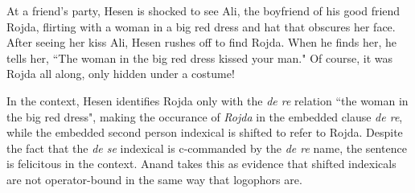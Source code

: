 \documentclass[output=paper]{langscibook}
\begin{document}
\begin{context}
At a friend's party, Hesen is shocked to see Ali, the boyfriend of his good friend Rojda, flirting with a woman in a big red dress and hat that obscures her face. After seeing her kiss Ali, Hesen rushes off to find Rojda. When he finds her, he tells her, ``The woman in the big red dress kissed your man." Of course, it was Rojda all along, only hidden under a costume!
\end{context}
\begin{exe}
	\label{noblock}
\end{exe}
In the context, Hesen identifies Rojda only with the \textit{de re} relation ``the woman in the big red dress", making the occurance of \textit{Rojda} in the embedded clause \textit{de re}, while the embedded second person indexical is shifted to refer to Rojda. Despite the fact that the \textit{de se} indexical is c-commanded by the \textit{de re} name, the sentence is felicitous in the context. Anand takes this as evidence that shifted indexicals are not operator-bound in the same way that logophors are.
\end{document}
